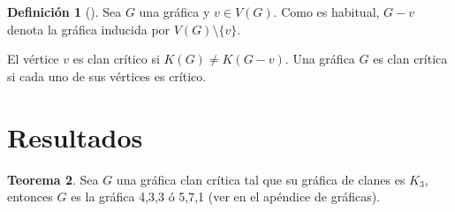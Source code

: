 \documentclass[12pt]{book}
\theoremstyle{definition}
\newtheorem{theorem}{Teorema}[chapter]
\newtheorem{definition}[theorem]{Definición}
\begin{document}
\begin{definition}[\citealt{Alcon:2006}]
Sea $G$ una gráfica y $v \in V(G)$. Como es habitual, $G-v$ denota la gráfica inducida por $V(G)\setminus \{v\}$.  

El vértice $v$ es clan crítico si $K(G)\neq K(G-v)$. Una gráfica $G$ es clan crítica si cada uno de sus vértices es crítico.
\end{definition}



\section*{Resultados}

\begin{theorem}
	Sea $G$ una gráfica clan crítica tal que su gráfica de clanes es $K_3$, entonces $G$ es la gráfica 4,3,3 ó 5,7,1 (ver en \cite{Harary:1969} el apéndice de gráficas).
\end{theorem}
\end{document}
